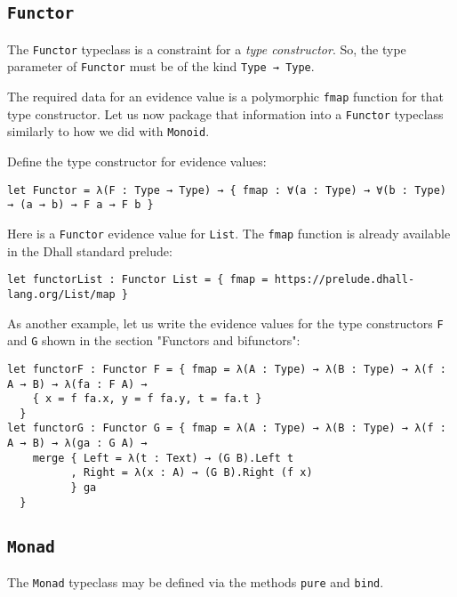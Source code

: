 \subsection{\lstinline!Functor!}


The \lstinline!Functor! typeclass is a constraint for a \emph{type constructor}.
So, the type parameter of \lstinline!Functor! must be of the kind \lstinline!Type → Type!.


The required data for an evidence value is a polymorphic \lstinline!fmap! function for that type constructor.
Let us now package that information into a \lstinline!Functor! typeclass similarly to how we did with \lstinline!Monoid!.


Define the type constructor for evidence values:


\begin{lstlisting}[language=Dhall]
let Functor = λ(F : Type → Type) → { fmap : ∀(a : Type) → ∀(b : Type) → (a → b) → F a → F b }
\end{lstlisting}


Here is a \lstinline!Functor! evidence value for \lstinline!List!. The \lstinline!fmap! function is already available in the Dhall standard prelude:


\begin{lstlisting}[language=Dhall]
let functorList : Functor List = { fmap = https://prelude.dhall-lang.org/List/map }
\end{lstlisting}


As another example, let us write the evidence values for the type constructors \lstinline!F! and \lstinline!G! shown in the section "Functors and bifunctors":


\begin{lstlisting}[language=Dhall]
let functorF : Functor F = { fmap = λ(A : Type) → λ(B : Type) → λ(f : A → B) → λ(fa : F A) →
    { x = f fa.x, y = f fa.y, t = fa.t }
  }
let functorG : Functor G = { fmap = λ(A : Type) → λ(B : Type) → λ(f : A → B) → λ(ga : G A) →
    merge { Left = λ(t : Text) → (G B).Left t
          , Right = λ(x : A) → (G B).Right (f x)
          } ga  
  }
\end{lstlisting}


\subsection{\lstinline!Monad!}


The \lstinline!Monad! typeclass may be defined via the methods \lstinline!pure! and \lstinline!bind!.


